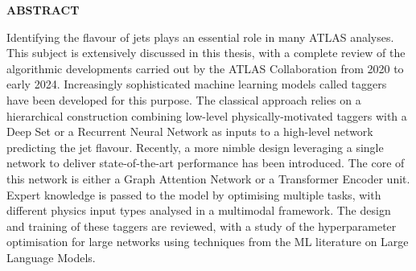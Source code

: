 
\vspace*{\fill}
\begin{center}
\textbf{\large \color{oxfordblue} ABSTRACT}
\end{center}
Identifying the flavour of jets plays an essential role in many ATLAS analyses. This subject is extensively discussed in this thesis, with a complete review of the algorithmic developments carried out by the ATLAS Collaboration from 2020 to early 2024. Increasingly sophisticated machine learning models called taggers have been developed for this purpose. The classical approach relies on a hierarchical construction combining low-level physically-motivated taggers with a Deep Set or a Recurrent Neural Network as inputs to a high-level network predicting the jet flavour. Recently, a more nimble design leveraging a single network to deliver state-of-the-art performance has been introduced. The core of this network is either a Graph Attention Network or a Transformer Encoder unit. Expert knowledge is passed to the model by optimising multiple tasks, with different physics input types analysed in a multimodal framework. The design and training of these taggers are reviewed, with a study of the hyperparameter optimisation for large networks using techniques from the ML literature on Large Language Models. \\

